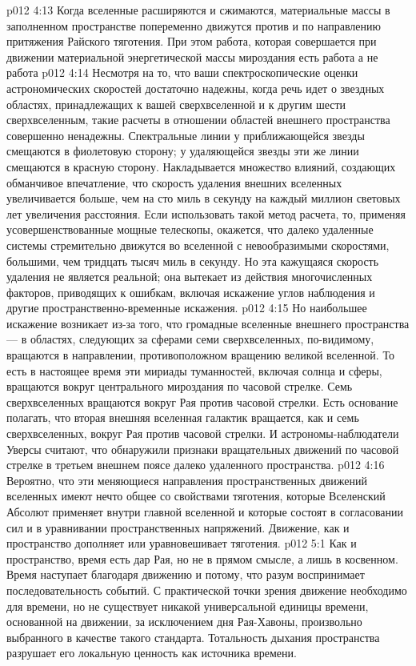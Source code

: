 \vs p012 4:13 Когда вселенные расширяются и сжимаются, материальные массы в заполненном пространстве попеременно движутся против и по направлению притяжения Райского тяготения. При этом работа, которая совершается при движении материальной энергетической массы мироздания есть работа  а не работа 
\vs p012 4:14 \pc Несмотря на то, что ваши спектроскопические оценки астрономических скоростей достаточно надежны, когда речь идет о звездных областях, принадлежащих к вашей сверхвселенной и к другим шести сверхвселенным, такие расчеты в отношении областей внешнего пространства совершенно ненадежны. Спектральные линии у приближающейся звезды смещаются в фиолетовую сторону; у удаляющейся звезды эти же линии смещаются в красную сторону. Накладывается множество влияний, создающих обманчивое впечатление, что скорость удаления внешних вселенных увеличивается больше, чем на сто миль в секунду на каждый миллион световых лет увеличения расстояния. Если использовать такой метод расчета, то, применяя усовершенствованные мощные телескопы, окажется, что далеко удаленные системы стремительно движутся во вселенной с невообразимыми скоростями, большими, чем тридцать тысяч миль в секунду. Но эта кажущаяся скорость удаления не является реальной; она вытекает из действия многочисленных факторов, приводящих к ошибкам, включая искажение углов наблюдения и другие пространственно\hyp{}временные искажения.
\vs p012 4:15 Но наибольшее искажение возникает из\hyp{}за того, что громадные вселенные внешнего пространства --- в областях, следующих за сферами семи сверхвселенных, по\hyp{}видимому, вращаются в направлении, противоположном вращению великой вселенной. То есть в настоящее время эти мириады туманностей, включая солнца и сферы, вращаются вокруг центрального мироздания по часовой стрелке. Семь сверхвселенных вращаются вокруг Рая против часовой стрелки. Есть основание полагать, что вторая внешняя вселенная галактик вращается, как и семь сверхвселенных, вокруг Рая против часовой стрелки. И астрономы\hyp{}наблюдатели Уверсы считают, что обнаружили признаки вращательных движений по часовой стрелке в третьем внешнем поясе далеко удаленного пространства.
\vs p012 4:16 Вероятно, что эти меняющиеся направления пространственных движений вселенных имеют нечто общее со свойствами тяготения, которые Вселенский Абсолют применяет внутри главной вселенной и которые состоят в согласовании сил и в уравнивании пространственных напряжений. Движение, как и пространство дополняет или уравновешивает тяготения.
\vs p012 5:1 Как и пространство, время есть дар Рая, но не в прямом смысле, а лишь в косвенном. Время наступает благодаря движению и потому, что разум воспринимает последовательность событий. С практической точки зрения движение необходимо для времени, но не существует никакой универсальной единицы времени, основанной на движении, за исключением дня Рая\hyp{}Хавоны, произвольно выбранного в качестве такого стандарта. Тотальность дыхания пространства разрушает его локальную ценность как источника времени.
